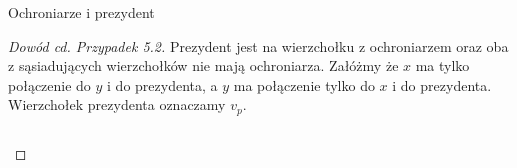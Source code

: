 \documentclass[polish]{beamer}
\begin{document}
\begin{frame}{Ochroniarze i prezydent}
    \begin{proof}[Dowód cd. Przypadek 5.2]
        \renewcommand{\qedsymbol}{}
        Prezydent jest na wierzchołku z ochroniarzem oraz oba z sąsiadujących wierzchołków nie mają ochroniarza. 
        Załóżmy że $x$ ma tylko połączenie do $y$ i do prezydenta, a $y$ ma połączenie tylko do $x$ i do prezydenta. 
        Wierzchołek prezydenta oznaczamy $v_p$.
        \begin{example}
            \begin{columns}
                    \centering
            \end{columns}
        \end{example}  
    \end{proof}
\end{frame}
\end{document}
